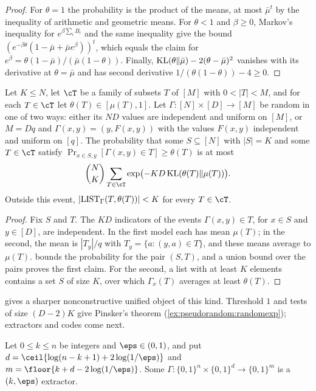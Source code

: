 \begin{refsection}
\begin{proof}
For $\theta=1$ the probability is the product of the means, at most $\bar\mu^t$ by the inequality of arithmetic and geometric means. For $\theta<1$ and $\beta\ge0$, Markov's inequality for $e^{\beta\sum_iB_i}$ and the same inequality give the bound $(e^{-\beta\theta}(1-\bar\mu+\bar\mu e^\beta))^t$, which equals the claim for $e^\beta=\theta(1-\bar\mu)/(\bar\mu(1-\theta))$. Finally, $\operatorname{KL}(\theta\Vert\bar\mu)-2(\theta-\bar\mu)^2$ vanishes with its derivative at $\theta=\bar\mu$ and has second derivative $1/(\theta(1-\theta))-4\ge0$.
\end{proof}

\begin{theorem}\label{thm:pseudorandom:union}
Let $K\le N$, let $\cT$ be a family of subsets $T$ of $[M]$ with $0<|T|<M$, and for each $T\in\cT$ let $\theta(T)\in[\mu(T),1]$. Let $\Gamma\colon[N]\times[D]\to[M]$ be random in one of two ways: either its $ND$ values are independent and uniform on $[M]$, or $M=Dq$ and $\Gamma(x,y)=(y,F(x,y))$ with the values $F(x,y)$ independent and uniform on $[q]$. The probability that some $S\subseteq[N]$ with $|S|=K$ and some $T\in\cT$ satisfy $\Pr_{x\in S,y}[\Gamma(x,y)\in T]\ge\theta(T)$ is at most
\[
  \binom NK\sum_{T\in\cT}\exp\bigl(-KD\pseudorandomKL(\theta(T)\Vert\mu(T))\bigr).
\]
Outside this event, $|\mathrm{LIST}_\Gamma(T,\theta(T))|<K$ for every $T\in\cT$.
\end{theorem}

\begin{proof}
Fix $S$ and $T$. The $KD$ indicators of the events $\Gamma(x,y)\in T$, for $x\in S$ and $y\in[D]$, are independent. In the first model each has mean $\mu(T)$; in the second, the mean is $|T_y|/q$ with $T_y=\{a:(y,a)\in T\}$, and these means average to $\mu(T)$.  bounds the probability for the pair $(S,T)$, and a union bound over the pairs proves the first claim. For the second, a list with at least $K$ elements contains a set $S$ of size $K$, over which $\Gamma_x(T)$ averages at least $\theta(T)$.
\end{proof}

\Textcite[Theorem~8.2]{Vadhan2012} gives a sharper nonconstructive unified object of this kind. Threshold $1$ and tests of size $(D-2)K$ give Pinsker's theorem (\cref{ex:pseudorandom:randomexp}); extractors and codes come next.

\begin{corollary}\label{cor:pseudorandom:randomext}
Let $0\le k\le n$ be integers and $\eps\in(0,1)$, and put $d=\ceil{\log(n-k+1)+2\log(1/\eps)}$ and $m=\floor{k+d-2\log(1/\eps)}$. Some $\Gamma\colon\{0,1\}^n\times\{0,1\}^d\to\{0,1\}^m$ is a $(k,\eps)$ extractor.
\end{corollary}


\end{refsection}
